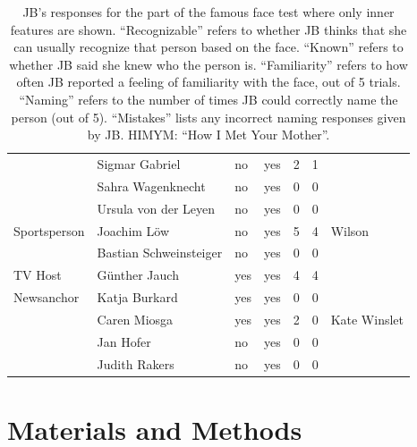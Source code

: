 \documentclass[fleqn,10pt]{SelfArx} %
\begin{document}
\begin{table}[htbp]
\begin{tabular}{lllllll}
		& Sigmar Gabriel               & no      & yes   & 2               & 1            &                  \\
		& Sahra Wagenknecht            & no      & yes   & 0               & 0            &                  \\
		& Ursula von der Leyen         & no      & yes   & 0               & 0            &                  \\
		Sportsperson    & Joachim Löw                 & no      & yes   & 5               & 4            & Wilson           \\
		& Bastian Schweinsteiger       & no      & yes   & 0               & 0            &                  \\
		TV Host         & Günther Jauch               & yes     & yes   & 4               & 4            &                  \\
		Newsanchor      & Katja Burkard                & yes     & yes   & 0               & 0            &                  \\
		& Caren Miosga                 & yes     & yes   & 2               & 0            & Kate Winslet     \\
		& Jan Hofer                    & no      & yes   & 0               & 0            &                  \\
		& Judith Rakers                & no      & yes   & 0               & 0            &  \\        
				\hline       
	\end{tabular}
	
	\parbox{16.5cm}{\caption*{JB's responses for the part of the famous face test where only inner features are shown. “Recognizable” refers to whether JB thinks that she can usually recognize that person based on the face. “Known” refers to whether JB said she knew who the person is. “Familiarity” refers to how often JB reported a feeling of familiarity with the face, out of 5 trials. “Naming” refers to the number of times JB could correctly name the person (out of 5). “Mistakes” lists any incorrect naming responses given by JB. HIMYM: “How I Met Your Mother”.} }
	\label{tab:famous}
	
\end{table}



\section{Materials and Methods}
\end{document}
